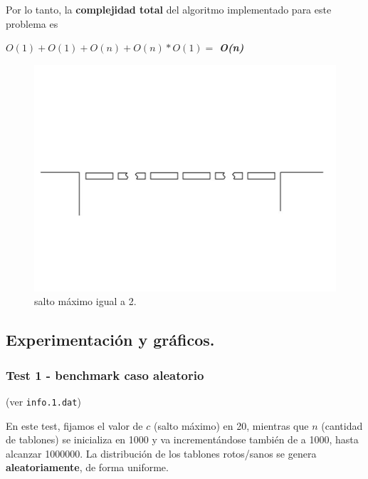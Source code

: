 Por lo tanto, la \textbf{complejidad total} del algoritmo implementado para este problema es

\begin{center}
  $O(1) + O(1) + O(n) + O(n)*O(1) =$ \textit{\textbf{O(n)}}
\end{center}

\begin{figure}[htb]
  \begin{center}
    \includegraphics[scale=0.25]{imagenes/ej1-complejidad.jpg}
  \end{center}
  \caption{salto máximo igual a 2.}
\end{figure}
    
\newpage


\subsection{Experimentación y gráficos.}

\vspace*{0.3cm}

\subsubsection{Test 1 - benchmark caso aleatorio}

(ver \verb|info.1.dat|) \medskip

En este test, fijamos el valor de $c$ (salto máximo) en 20, mientras que $n$ (cantidad de tablones)
se inicializa en 1000 y va incrementándose también de a 1000, hasta alcanzar 1000000. La
distribución de los tablones rotos/sanos se genera \textbf{aleatoriamente}, de forma uniforme.

